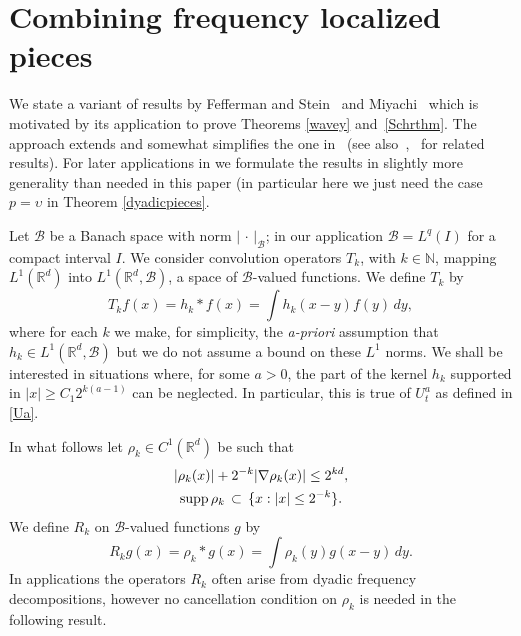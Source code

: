 \documentclass[11pt]{amsart}
\theoremstyle{definition}
\numberwithin{theorem}{section}
\numberwithin{definition}{section}
\renewcommand{\wp}{\upsilon}
\newcommand{\Be}{\begin{equation}}
\newcommand{\Ee}{\end{equation}}
\newcommand{\R}{\mathbb{R}}
\newcommand{\note}[1]{\footnote{\texttt{\Small #1}}}
\def\R{\mathbb R}
\def\N{\mathbb N}
\def\sB{{\mathscr{B}}}
\def\supp{{\text{\rm supp}\,}}
\def\om{\omega}              \def\Om{\Omega}
\def\bbR{{\mathbb {R}}}
\begin{document}
\appendix

\section{Combining  frequency localized  pieces} \label{localtoglobal}
We state a  variant of results by Fefferman and Stein~\cite{fest} and
Miyachi~\cite{mi}  which is motivated by its application to prove Theorems
\ref{wavey} and~\ref{Schrthm}. The approach extends and somewhat simplifies the one in~\cite{rose}  (see also~\cite{se},~\cite{prrose}
for related results).
For later applications in \cite{lerose2} we formulate the results in
slightly more generality than needed in this paper
(in particular here we just need the case $p=\wp$ in
Theorem \ref{dyadicpieces}.




Let $\sB$ be a Banach space with norm $|\,\cdot\,|_\sB$; in our application
$\sB=L^q(I)$ for a compact interval $I$.
 We consider convolution operators $T_k$, with $k\in\N$,  mapping $L^1(\bbR^d)$ into $L^1(\bbR^d,\sB)$, a space of $\sB$-valued functions. We define $T_k$ by
$$T_k f(x)=h_k*f(x)=\int h_k(x-y) f(y)\,dy,$$
 where
for each $k$
we make, for simplicity,   the {\it a-priori} assumption that
$h_k\in L^1(\R^d,\sB)$  but we do not assume a bound
on these $L^1$
norms.  We shall be interested in situations where, for some $a>0$, the
 part of the kernel $h_k$ supported in $|x|\ge C_1 2^{k(a-1)}$ can be  neglected.
In particular, this is true of $U_t^a$ as defined in \eqref{Ua}.

In what follows  let  $\rho_k\in C^1(\bbR^d)$ be such that
\Be \label{rhok}
\begin{gathered}  |\rho_k(x)|+2^{-k}|\nabla \rho_k(x)|\le 2^{kd},
\\
\supp \rho_k \,\subset \, \{x:|x|\le 2^{-k}\}.
\end{gathered}
\Ee
We define $R_k$ on $\sB$-valued functions $g$ by
\Be \label{Rkdef}
 R_k g(x)= \rho_k* g(x)=\int\rho_k(y) g(x-y)\,dy. \Ee
In applications the   operators $R_k$ often arise from
  dyadic frequency decompositions, however no cancellation
condition on $\rho_k$ is needed in the following result.
\end{document}
